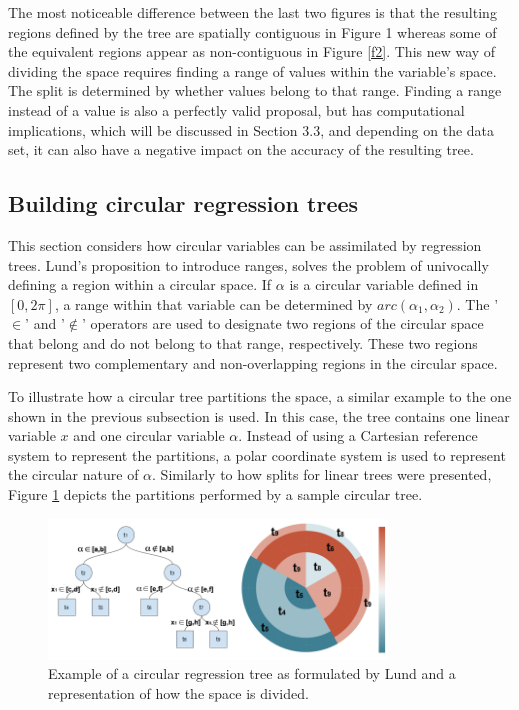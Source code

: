 \documentclass[times,twocolumn,final,authoryear]{elsarticle}
\begin{document}
The most noticeable difference between the last two figures is that the resulting regions defined by the tree are spatially contiguous in Figure 1 whereas some of the equivalent regions appear as non-contiguous in Figure \ref{f2}. This new way of dividing the space requires finding a range of values within the variable’s space. The split is determined by whether values belong to that range. Finding a range instead of a value is also a perfectly valid proposal, but has computational implications, which will be discussed in Section 3.3, and depending on the data set, it can also have a negative impact on the accuracy of the resulting tree.

\subsection{Building circular regression trees}

This section considers how circular variables can be assimilated by regression trees. Lund's proposition to introduce ranges, solves the problem of univocally defining a region within a circular space. If $\alpha$ is a circular variable defined in $[0, 2\pi]$, a range within that variable can be determined by $arc(\alpha_1, \alpha_2)$. The '$\in$' and '$\notin$' operators are used to designate two regions of the circular space that belong and do not belong to that range, respectively. These two regions represent two complementary and non-overlapping regions in the circular space.

To illustrate how a circular tree partitions the space, a similar example to the one shown in the previous subsection is used. In this case, the tree contains one linear variable $x$ and one circular variable $\alpha$. Instead of using a Cartesian reference system to represent the partitions, a polar coordinate system is used to represent the circular nature of $\alpha$. Similarly to how splits for linear trees were presented, Figure \ref{f3} depicts the partitions performed by a sample circular tree.

%
\begin{figure}
  \includegraphics[width=9cm]{fig3_master.png}
\caption{Example of a circular regression tree as formulated by Lund and a representation of how the space is divided.}
\label{f3}       %
\end{figure}
%
\end{document}
